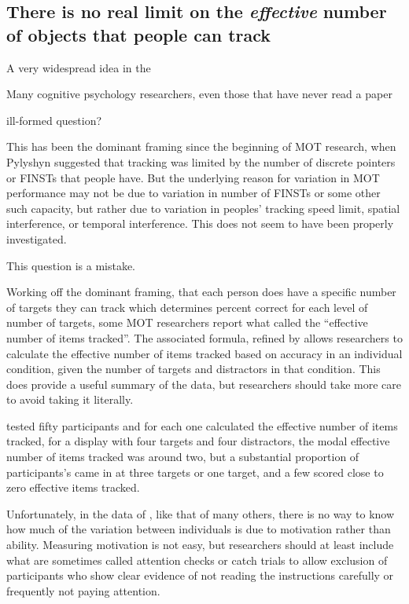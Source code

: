 \documentclass[]{book}
\begin{document}
\hypertarget{there-is-no-real-limit-on-the-effective-number-of-objects-that-people-can-track}{%
\subsection{\texorpdfstring{There is no real limit on the \emph{effective} number of objects that people can track}{There is no real limit on the effective number of objects that people can track}}\label{there-is-no-real-limit-on-the-effective-number-of-objects-that-people-can-track}}

A very widespread idea in the

Many cognitive psychology researchers, even those that have never read a paper

ill-formed question?

This has been the dominant framing since the beginning of MOT research, when Pylyshyn suggested that tracking was limited by the number of discrete pointers or FINSTs that people have. But the underlying reason for variation in MOT performance may not be due to variation in number of FINSTs or some other such capacity, but rather due to variation in peoples' tracking speed limit, spatial interference, or temporal interference. This does not seem to have been properly investigated.

This question is a mistake.

Working off the dominant framing, that each person does have a specific number of targets they can track which determines percent correct for each level of number of targets, some MOT researchers report what \citet{schollWhatVisualObject2001} called the ``effective number of items tracked''. The associated formula, refined by \citet{hullemanMathematicsMultipleObject2005a} allows researchers to calculate the effective number of items tracked based on accuracy in an individual condition, given the number of targets and distractors in that condition. This does provide a useful summary of the data, but researchers should take more care to avoid taking it literally.

\citet{meyerhoffIndividualDifferencesVisual2020} tested fifty participants and for each one calculated the effective number of items tracked, for a display with four targets and four distractors, the modal effective number of items tracked was around two, but a substantial proportion of participants's came in at three targets or one target, and a few scored close to zero effective items tracked.

Unfortunately, in the data of \citet{meyerhoffIndividualDifferencesVisual2020}, like that of many others, there is no way to know how much of the variation between individuals is due to motivation rather than ability. Measuring motivation is not easy, but researchers should at least include what are sometimes called attention checks or catch trials to allow exclusion of participants who show clear evidence of not reading the instructions carefully or frequently not paying attention.
\end{document}
